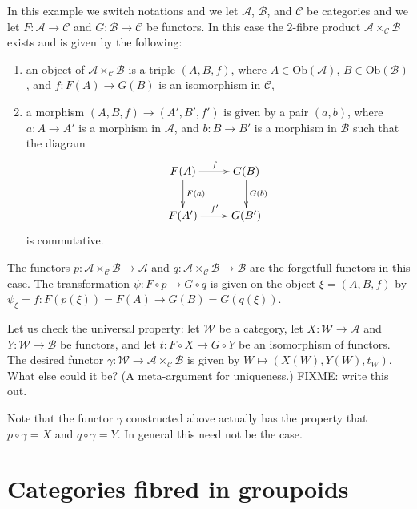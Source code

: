 \begin{example}
\label{example-2-fibre-product-categories}
In this example we switch notations and we let $\mathcal{A}$, $\mathcal{B}$,
and $\mathcal{C}$ be categories and we let $F : \mathcal{A} \to \mathcal{C}$
and $G : \mathcal{B} \to \mathcal{C}$ be functors. In this case the 2-fibre
product $\mathcal{A}\times_\mathcal{C} \mathcal{B}$ exists and is given by
the following:
\begin{enumerate}
\item an object of $\mathcal{A}\times_\mathcal{C} \mathcal{B}$ is a triple
$(A,B,f)$, where $A\in \text{Ob}(\mathcal{A})$, $B\in \text{Ob}(\mathcal{B})$,
and $f : F(A) \to G(B)$ is an isomorphism in $\mathcal{C}$,
\item a morphism $(A,B,f) \to (A',B', f')$ is given by a pair $(a,b)$, where
$a : A \to A'$ is a morphism in $\mathcal{A}$, and $b : B \to B'$ is a
morphism in $\mathcal{B}$ such that the diagram 
$$
\xymatrix{
F(A) \ar[r]^f \ar[d]^{F(a)} & G(B) \ar[d]^{G(b)} \\
F(A') \ar[r]^{f'} & G(B')
}
$$
is commutative.
\end{enumerate}
The functors $p : \mathcal{A}\times_\mathcal{C}\mathcal{B} \to \mathcal{A}$
and $q : \mathcal{A}\times_\mathcal{C}\mathcal{B} \to \mathcal{B}$ are the
forgetfull functors in this case. The transformation $\psi : F \circ p \to
G \circ q$ is given on the object $\xi = (A,B,f)$ by
$\psi_\xi = f : F(p(\xi)) = F(A) \to G(B) = G(q(\xi))$.

\medskip\noindent
Let us check the universal property: let $\mathcal{W}$ be a category, let
$X : \mathcal{W} \to \mathcal{A}$ and $Y : \mathcal{W} \to \mathcal{B}$ be
functors, and let $t : F \circ X \to G \circ Y$ be an isomorphism of functors.
The desired functor $\gamma : \mathcal{W} \to
\mathcal{A}\times_\mathcal{C}\mathcal{B}$
is given by $W \mapsto (X(W), Y(W), t_W)$. What else could it be? 
(A meta-argument for uniqueness.) FIXME: write this out.

\medskip\noindent
Note that the functor $\gamma$ constructed above actually has the property
that $p \circ \gamma = X$ and $q \circ \gamma = Y$. In general this need not
be the case.
\end{example}

\section{Categories fibred in groupoids}
\label{section-fibred-groupoids}

